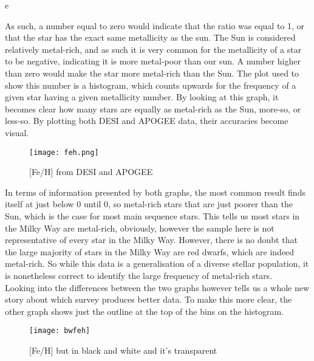 e\documentclass{article}
\begin{document}
\indent As such, a number equal to zero would indicate that the ratio was equal to 1, or that the star has the exact same metallicity as the sun. The Sun is considered relatively metal-rich, and as such it is very common for the metallicity of a star to be negative, indicating it is more metal-poor than our sun. A number higher than zero would make the star more metal-rich than the Sun. The plot used to show this number is a histogram, which counts upwards for the frequency of a given star having a given metallicity number. By looking at this graph, it becomes clear how many stars are equally as metal-rich as the Sun, more-so, or less-so. By plotting both DESI and APOGEE data, their accuracies become visual. \begin{figure}[H]
    \centering
    \texttt{[image: feh.png]}
    \caption{[Fe/H] from DESI and APOGEE }
    \label{fig:1}
\end{figure}
\indent In terms of information presented by both graphs, the most common result finds itself at just below 0 until 0, so metal-rich stars that are just poorer than the Sun, which is the case for most main sequence stars. This tells us most stars in the Milky Way are metal-rich, obviously, however the sample here is not representative of every star in the Milky Way. However, there is no doubt that the large majority of stars in the Milky Way are red dwarfs, which are indeed metal-rich. So while this data is a generalisation of a diverse stellar population, it is nonetheless correct to identify the large frequency of metal-rich stars.\\
\indent Looking into the differences between the two graphs however tells us a whole new story about which survey produces better data. To make this more clear, the other graph shows just the outline at the top of the bins on the histogram.\\
\begin{figure}[h!tbp]
    \centering
    \texttt{[image: bwfeh]}
    \caption{[Fe/H] but in black and white and it's transparent}
    \label{fig:2}
\end{figure}
\end{document}
